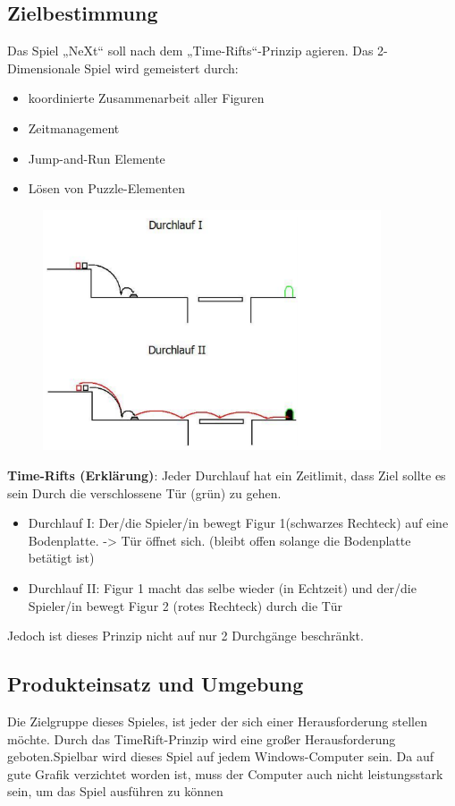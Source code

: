 \subsection{Zielbestimmung}
Das Spiel „NeXt“ soll nach dem „Time-Rifts“-Prinzip agieren.
Das 2-Dimensionale Spiel wird gemeistert durch:
\begin{itemize}
	\item koordinierte Zusammenarbeit aller Figuren
	\item Zeitmanagement
	\item Jump-and-Run Elemente
	\item Lösen von Puzzle-Elementen
\end{itemize}
\begin{figure}[H]
	\centering
	\includegraphics[width=10cm]{images/TimeRift.png}
\end{figure}
\textbf{Time-Rifts (Erklärung)}: Jeder Durchlauf hat ein Zeitlimit, dass Ziel sollte es sein Durch die
verschlossene Tür (grün) zu gehen.
\begin{itemize}
	\item Durchlauf I:
	Der/die Spieler/in bewegt Figur 1(schwarzes Rechteck) auf eine Bodenplatte.
	-> Tür öffnet sich. (bleibt offen solange die Bodenplatte betätigt ist)
	\item Durchlauf II:
	Figur 1 macht das selbe wieder (in Echtzeit) und der/die Spieler/in bewegt Figur 2 (rotes
	Rechteck) durch die Tür
\end{itemize}
Jedoch ist dieses Prinzip nicht auf nur 2 Durchgänge beschränkt.
\subsection{Produkteinsatz und Umgebung}
Die Zielgruppe dieses Spieles, ist jeder der sich einer Herausforderung stellen möchte. Durch das TimeRift-Prinzip wird eine großer Herausforderung geboten.Spielbar wird dieses Spiel auf jedem Windows-Computer sein. Da auf gute Grafik verzichtet worden ist, muss der Computer auch nicht leistungsstark sein, um das Spiel ausführen zu können 
